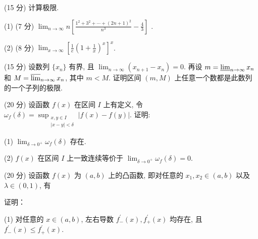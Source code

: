 \par{}
(15 分) 计算极限.\par
(1) (7 分)  $\lim_{n\to\infty}n\left[\frac{1^{2}+3^{2}+\cdots+(2n+1)^{2}}{n^{3}}-\frac{4}{3}\right]$ .\par
(2) (8 分) $\lim_{x \to \infty} \left[ \frac{1}{e} \left( 1 + \frac{1}{x} \right)^x \right]^x$.\par
\par{}
(15 分) 设数列 $\{x_{n}\}$ 有界, 且 $\lim_{n\to \infty}(x_{n + 1} - x_n) = 0$. 再设 $m = \varliminf_{n\to \infty}x_n$ 和 $M = \varlimsup_{n\to \infty}x_n$, 其中 $m < M$. 证明区间 $(m,M)$ 上任意一个数都是此数列的一个子列的极限.\par
\par{}
(20 分) 设函数 $f(x)$ 在区间 $I$ 上有定义, 令 $\omega_f(\delta) = \sup_{\substack{x,y \in I \\ |x - y| < \delta}} |f(x) - f(y)|$. 证明:\par
(1) $\lim_{\delta \to 0^{+}}\omega_{f}(\delta)$ 存在.\par
(2) $f(x)$ 在区间 $I$ 上一致连续等价于 $\lim_{\delta \to 0^{+}}\omega_{f}(\delta) = 0.$\par
\par{}
\par{}
(20 分) 设函数 $f(x)$ 为 $(a, b)$ 上的凸函数, 即对任意的 $x_1, x_2 \in (a, b)$ 以及 $\lambda \in (0, 1)$, 有\par
\nopagebreak[4]
证明：\par
(1) 对任意的 $x \in (a, b)$, 左右导数 $f_{-}^{\prime}(x), f_{+}^{\prime}(x)$ 均存在, 且 $f_{-}^{\prime}(x) \leq f_{+}^{\prime}(x)$.\par
